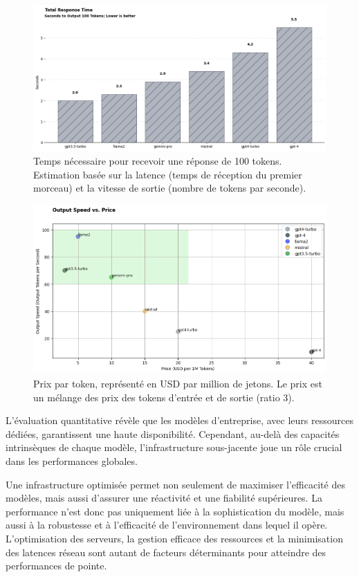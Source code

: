 \begin{figure}[H]
    \centering
    \includegraphics[width=15cm]{gfx/fig-response-time-eval.png}
    \caption{Temps nécessaire pour recevoir une réponse de 100 tokens. Estimation basée sur la latence (temps de réception du premier morceau) et la vitesse de sortie (nombre de tokens par seconde).}
    \label{fig:model-response-time-eval}
\end{figure}

\begin{figure}[H]
    \centering
    \includegraphics[width=15cm]{gfx/fig-price-speed-eval.png}
    \caption{Prix par token, représenté en USD par million de jetons. Le prix est un mélange des prix des tokens d'entrée et de sortie (ratio 3).}
    \label{fig:model-price-speed-eval}
\end{figure}

L'évaluation quantitative révèle que les modèles d'entreprise, avec leurs ressources dédiées, garantissent une haute disponibilité. Cependant, au-delà des capacités intrinsèques de chaque modèle, l'infrastructure sous-jacente joue un rôle crucial dans les performances globales. 

Une infrastructure optimisée permet non seulement de maximiser l'efficacité des modèles, mais aussi d'assurer une réactivité et une fiabilité supérieures. La performance n'est donc pas uniquement liée à la sophistication du modèle, mais aussi à la robustesse et à l'efficacité de l'environnement dans lequel il opère. L'optimisation des serveurs, la gestion efficace des ressources et la minimisation des latences réseau sont autant de facteurs déterminants pour atteindre des performances de pointe.


